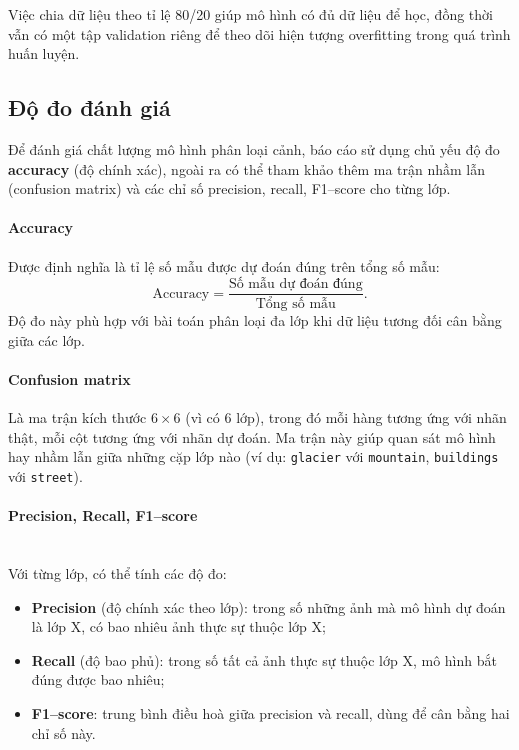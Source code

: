 \documentclass[12pt,a4paper]{article}
\begin{document}
Việc chia dữ liệu theo tỉ lệ 80/20 giúp mô hình có đủ dữ liệu để học, đồng thời vẫn có một tập validation riêng để theo dõi hiện tượng overfitting trong quá trình huấn luyện.

\subsection{Độ đo đánh giá}
Để đánh giá chất lượng mô hình phân loại cảnh, báo cáo sử dụng chủ yếu độ đo \textbf{accuracy} (độ chính xác), ngoài ra có thể tham khảo thêm ma trận nhầm lẫn (confusion matrix) và các chỉ số precision, recall, F1--score cho từng lớp.

\paragraph{Accuracy} Được định nghĩa là tỉ lệ số mẫu được dự đoán đúng trên tổng số mẫu:
\begin{equation}
    \text{Accuracy} = \frac{\text{Số mẫu dự đoán đúng}}{\text{Tổng số mẫu}}.
\end{equation}
Độ đo này phù hợp với bài toán phân loại đa lớp khi dữ liệu tương đối cân bằng giữa các lớp.

\paragraph{Confusion matrix} Là ma trận kích thước $6\times 6$ (vì có 6 lớp), trong đó mỗi hàng tương ứng với nhãn thật, mỗi cột tương ứng với nhãn dự đoán. Ma trận này giúp quan sát mô hình hay nhầm lẫn giữa những cặp lớp nào (ví dụ: \texttt{glacier} với \texttt{mountain}, \texttt{buildings} với \texttt{street}).

\paragraph{Precision, Recall, F1--score} \hfill\\
Với từng lớp, có thể tính các độ đo:
\begin{itemize}
    \item \textbf{Precision} (độ chính xác theo lớp): trong số những ảnh mà mô hình dự đoán là lớp X, có bao nhiêu ảnh thực sự thuộc lớp X;
    \item \textbf{Recall} (độ bao phủ): trong số tất cả ảnh thực sự thuộc lớp X, mô hình bắt đúng được bao nhiêu;
    \item \textbf{F1--score}: trung bình điều hoà giữa precision và recall, dùng để cân bằng hai chỉ số này.
\end{itemize}
\end{document}
